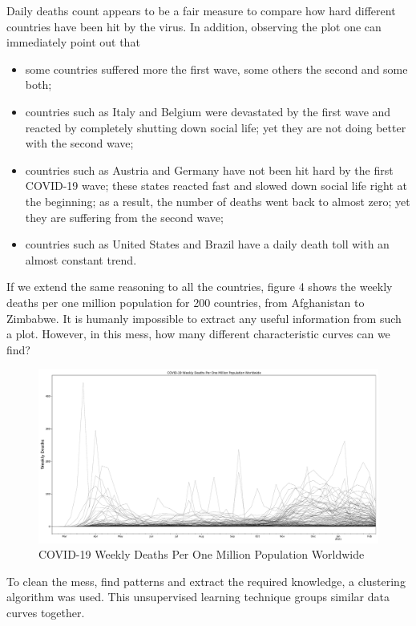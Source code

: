 \documentclass[11pt,a4paper]{article}
\begin{document}
\noindent Daily deaths count appears to be a fair measure to compare how hard
different countries have been hit by the virus. In addition, observing the plot
one can immediately point out that
\begin{itemize}
    \item some countries suffered more the first wave, some others the second
    and some both;
    \item countries such as {\color{ts_italy}Italy} and
    {\color{ts_belgium}Belgium} were devastated by the first wave and reacted
    by completely shutting down social life; yet they are not doing better with
    the second wave;
    \item countries such as {\color{ts_austria}Austria} and
    {\color{ts_germany}Germany} have not been hit hard by the first COVID-19
    wave; these states reacted fast and slowed down social life right at the
    beginning; as a result, the number of deaths went back to almost zero; yet
    they are suffering from the second wave;
    \item countries such as {\color{ts_unitedstates}United States} and
    {\color{cyan}Brazil} have a daily death toll with an almost constant
    trend.
\end{itemize}
If we extend the same reasoning to all the countries, figure 4 shows the weekly
deaths per one million population for 200 countries, from Afghanistan to
Zimbabwe. It is humanly impossible to extract any useful information from such a
plot. However, in this mess, how many different characteristic curves can we
find?
\begin{figure}[H]
    \begin{center}
        \hspace*{-0.3cm}
        \includegraphics[scale=0.32]{img/weekly-deaths-worldwide.pdf}
    \end{center}
    \caption{COVID-19 Weekly Deaths Per One Million Population Worldwide}
\end{figure}
\noindent
To clean the mess, find patterns and extract the required knowledge, a
clustering algorithm was used. This unsupervised learning technique groups
similar data curves together.
\end{document}
